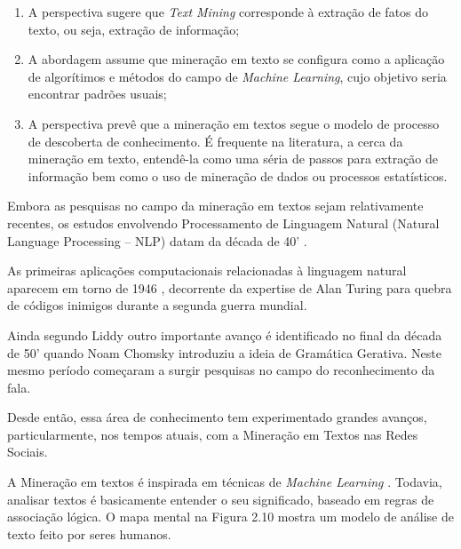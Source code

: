 \begin{enumerate}
	\item A perspectiva sugere que \textit{Text Mining} corresponde à extração de fatos do texto, ou seja, extração de informação;
	\item A abordagem assume que mineração em texto se configura como a aplicação de algorítimos e métodos do campo de \textit{Machine Learning}, cujo objetivo seria encontrar padrões usuais;
	\item A perspectiva prevê que a mineração em textos segue o modelo de processo de descoberta de conhecimento. É frequente na literatura, a cerca da mineração em texto, entendê-la como uma séria de passos para extração de informação bem como o uso de mineração de dados ou processos estatísticos.
\end{enumerate}

Embora as pesquisas no campo da mineração em textos sejam relativamente recentes, os estudos envolvendo Processamento de Linguagem Natural (Natural Language Processing -- NLP) datam da década de 40' \cite{liddy2001natural}. 

As primeiras aplicações computacionais relacionadas à linguagem natural aparecem em torno de 1946 \cite{liddy2001natural},  decorrente da expertise de Alan Turing para quebra de códigos inimigos durante a segunda guerra mundial. 

Ainda segundo Liddy \cite{liddy2001natural} outro importante avanço é identificado no final da década de 50' quando Noam Chomsky introduziu a ideia de Gramática Gerativa. Neste mesmo período começaram a surgir pesquisas no campo do reconhecimento da fala. 

Desde então, essa área de conhecimento tem experimentado grandes avanços, particularmente, nos tempos atuais, com a Mineração em Textos nas Redes Sociais.

A Mineração em textos é inspirada em técnicas de \textit{Machine Learning} \cite{Aranha2006}. Todavia, analisar textos é basicamente entender o seu significado, baseado em regras de associação lógica. O mapa mental na Figura 2.10 mostra um modelo de análise de texto feito por seres humanos.

